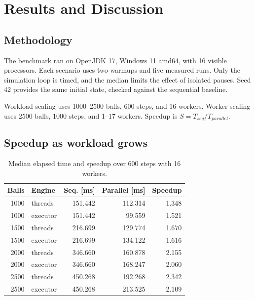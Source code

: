 \clearpage
\section{Results and Discussion}

\subsection{Methodology}

The benchmark ran on OpenJDK 17, Windows 11 amd64, with 16 visible processors.
Each scenario uses two warmups and five measured runs.
Only the simulation loop is timed, and the median limits the effect of isolated pauses.
Seed 42 provides the same initial state, checked against the sequential baseline.

Workload scaling uses 1000--2500 balls, 600 steps, and 16 workers.
Worker scaling uses 2500 balls, 1000 steps, and 1--17 workers.
Speedup is $S=T_{seq}/T_{parallel}$.

\subsection{Speedup as workload grows}

\begin{table}[htbp]
    \centering
    \small
    \setlength{\tabcolsep}{5pt}
    \begin{tabular}{rlrrr}
        \hline
        Balls & Engine & Seq. [ms] & Parallel [ms] & Speedup \\
        \hline
        1000 & threads  & 151.442 & 112.314 & 1.348 \\
        1000 & executor & 151.442 &  99.559 & 1.521 \\
        1500 & threads  & 216.699 & 129.774 & 1.670 \\
        1500 & executor & 216.699 & 134.122 & 1.616 \\
        2000 & threads  & 346.660 & 160.878 & 2.155 \\
        2000 & executor & 346.660 & 168.247 & 2.060 \\
        2500 & threads  & 450.268 & 192.268 & 2.342 \\
        2500 & executor & 450.268 & 213.525 & 2.109 \\
        \hline
    \end{tabular}
    \caption{Median elapsed time and speedup over 600 steps with 16 workers.}
    \label{tab:workload-speedup}
\end{table}


